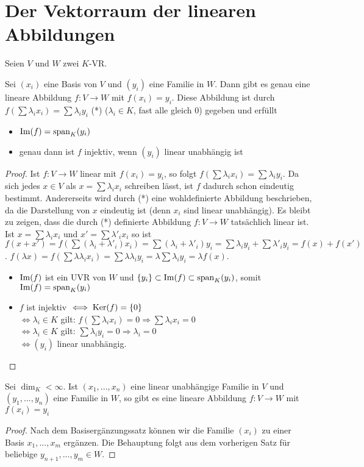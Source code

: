 \section{Der Vektorraum der linearen Abbildungen}

Seien $V$ und $W$ zwei $K$-VR.

\begin{proposition}
	Sei $(x_i)$ eine Basis von $V$ und $(y_i)$ eine Familie in $W$. Dann gibt es genau eine lineare 
	Abbildung $f:V\to W$ mit $f(x_i)=y_i$. Diese Abbildung ist durch $f(\sum \lambda_ix_i)=\sum \lambda_iy_i$ 
	(*) ($\lambda_i\in K$, fast alle gleich 0) gegeben und erfüllt
	\begin{itemize}
		\item $\operatorname{Im}(f)=\operatorname{span}_K(y_i)$
		\item genau dann ist $f$ injektiv, wenn $(y_i)$ linear unabhängig ist
	\end{itemize}
\end{proposition}
\begin{proof}
	Ist $f:V\to W$ linear mit $f(x_i)=y_i$, so folgt $f(\sum \lambda_ix_i)=\sum \lambda_iy_i$. Da sich jedes 
	$x\in V$ als $x=\sum  \lambda_ix_i$ schreiben lässt, ist $f$ dadurch schon eindeutig bestimmt. Andererseits wird 
	durch (*) eine wohldefinierte Abbildung beschrieben, da die Darstellung von $x$ eindeutig ist (denn $x_i$ sind 
	linear unabhängig). Es bleibt zu zeigen, dass die durch (*) definierte Abbildung $f:V\to W$ tatsächlich linear ist. 
	Ist $x=\sum \lambda_ix_i$ und $x'=\sum \lambda'_ix_i$ so ist $f(x+x')=f(\sum (\lambda_i+\lambda'_i)x_i)=
	\sum (\lambda_i+\lambda'_i)y_i=\sum \lambda_iy_i+\sum \lambda'_iy_i=f(x)+f(x')$. $f(\lambda x)=f(\sum \lambda
	\lambda_ix_i)=\sum \lambda\lambda_iy_i=\lambda\sum\lambda_iy_i=\lambda f(x)$.
	\begin{itemize}
		\item $\operatorname{Im}(f)$ ist ein UVR von $W$ und $\{y_i\}\subset \operatorname{Im}(f)\subset \operatorname{span}_K(y_i)$, somit $\operatorname{Im}(f)=\operatorname{span}_K(y_i)$
		\item $f$ ist injektiv $\iff \operatorname{Ker}(f)=\{0\}$ \\ 
		$\iff \lambda_i\in K$ gilt: $f(\sum \lambda_ix_i)=0\Rightarrow \sum \lambda_ix_i=0$ \\ 
		$\iff \lambda_i\in K$ gilt: $\sum\lambda_iy_i=0\Rightarrow \lambda_i=0$ \\ 
		$\iff (y_i)$ linear unabhängig.
	\end{itemize}
\end{proof}

\begin{conclusion}
	Sei $\dim_K<\infty$. Ist $(x_1,...,x_n)$ eine linear unabhängige Familie in $V$ und $(y_1,...,y_n)$ 
	eine Familie in $W$, so gibt es eine lineare Abbildung $f:V\to W$ mit $f(x_i)=y_i$
\end{conclusion}
\begin{proof}
	Nach dem Basisergänzungssatz können wir die Familie $(x_i)$ zu einer Basis $x_1,...,x_m$ ergänzen. Die Behauptung 
	folgt aus dem vorherigen Satz für beliebige $y_{n+1},...,y_m\in W$.
\end{proof}

